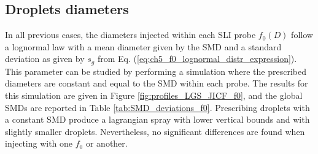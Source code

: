 \subsection{Droplets diameters}

In all previous cases, the diameters injected within each SLI probe $f_0 \left( D \right)$ follow a lognormal law with a mean diameter given by the SMD and a standard deviation as given by $s_g$ from Eq. (\ref{eq:ch5_f0_lognormal_distr_expression}). This parameter can be studied by performing a simulation where the prescribed diameters are constant and equal to the SMD within each probe. The results for this simulation are given in Figure \ref{fig:profiles_LGS_JICF_f0}, and the global SMDs are reported in Table \ref{tab:SMD_deviations_f0}. Prescribing droplets with a constant SMD produce a lagrangian spray with lower vertical bounds and with slightly smaller droplets. Nevertheless, no significant differences are found when injecting with one $f_0$ or another. 


